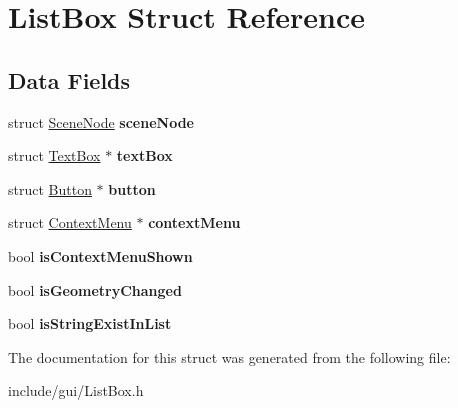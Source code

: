 \hypertarget{struct_list_box}{}\section{List\+Box Struct Reference}
\label{struct_list_box}
\subsection*{Data Fields}
\begin{DoxyCompactItemize}
\item 
\hypertarget{struct_list_box_aca8025f56fb4ce20b974ec9a3292a9e4}{}\label{struct_list_box_aca8025f56fb4ce20b974ec9a3292a9e4} 
struct \hyperlink{struct_scene_node}{Scene\+Node} {\bfseries scene\+Node}
\item 
\hypertarget{struct_list_box_a4c2396262291ca9d80db5fcab602e824}{}\label{struct_list_box_a4c2396262291ca9d80db5fcab602e824} 
struct \hyperlink{struct_text_box}{Text\+Box} $\ast$ {\bfseries text\+Box}
\item 
\hypertarget{struct_list_box_ae7aee5d2fea3fa9c160fcb9341275053}{}\label{struct_list_box_ae7aee5d2fea3fa9c160fcb9341275053} 
struct \hyperlink{struct_button}{Button} $\ast$ {\bfseries button}
\item 
\hypertarget{struct_list_box_a5b4d2d19ff75508aa4f61e4c42a42e3c}{}\label{struct_list_box_a5b4d2d19ff75508aa4f61e4c42a42e3c} 
struct \hyperlink{struct_context_menu}{Context\+Menu} $\ast$ {\bfseries context\+Menu}
\item 
\hypertarget{struct_list_box_a06e83cefd5236408ec725d6dd353ec63}{}\label{struct_list_box_a06e83cefd5236408ec725d6dd353ec63} 
bool {\bfseries is\+Context\+Menu\+Shown}
\item 
\hypertarget{struct_list_box_a8ea7e8ac3e3330830aa7a4309390f3ac}{}\label{struct_list_box_a8ea7e8ac3e3330830aa7a4309390f3ac} 
bool {\bfseries is\+Geometry\+Changed}
\item 
\hypertarget{struct_list_box_a284c5592089954400f6ea24229c31617}{}\label{struct_list_box_a284c5592089954400f6ea24229c31617} 
bool {\bfseries is\+String\+Exist\+In\+List}
\end{DoxyCompactItemize}


The documentation for this struct was generated from the following file\+:\begin{DoxyCompactItemize}
\item 
include/gui/List\+Box.\+h\end{DoxyCompactItemize}
